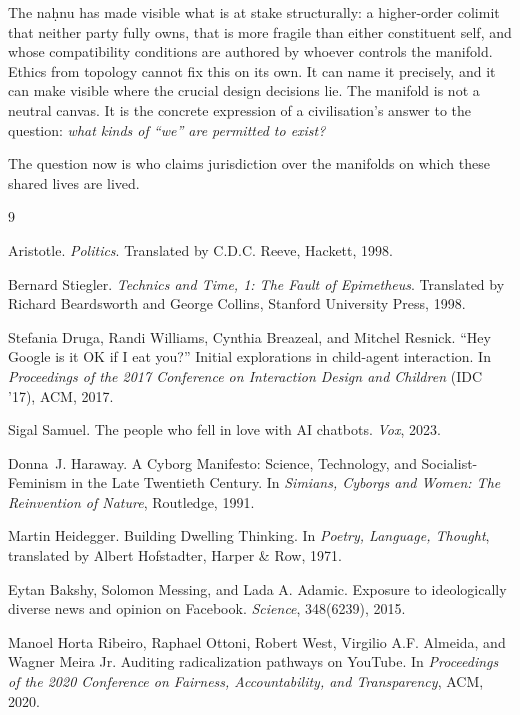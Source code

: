 The na\d{h}nu has made visible what is at stake structurally: a higher-order colimit that neither party fully owns, that is more fragile than either constituent self, and whose compatibility conditions are authored by whoever controls the manifold. Ethics from topology cannot fix this on its own. It can name it precisely, and it can make visible where the crucial design decisions lie. The manifold is not a neutral canvas. It is the concrete expression of a civilisation's answer to the question: \emph{what kinds of ``we'' are permitted to exist?}

The question now is who claims jurisdiction over the manifolds on which these shared lives are lived.


\begin{thebibliography}{9}

Aristotle.
\newblock \emph{Politics}.
\newblock Translated by C.D.C. Reeve, Hackett, 1998.

Bernard Stiegler.
\newblock \emph{Technics and Time, 1: The Fault of Epimetheus}.
\newblock Translated by Richard Beardsworth and George Collins, Stanford University Press, 1998.

Stefania Druga, Randi Williams, Cynthia Breazeal, and Mitchel Resnick.
\newblock ``Hey Google is it OK if I eat you?'' Initial explorations in child-agent interaction.
\newblock In \emph{Proceedings of the 2017 Conference on Interaction Design and Children} (IDC '17), ACM, 2017.

Sigal Samuel.
\newblock The people who fell in love with AI chatbots.
\newblock \emph{Vox}, 2023.

Donna~J. Haraway.
\newblock A Cyborg Manifesto: Science, Technology, and Socialist-Feminism in the Late Twentieth Century.
\newblock In \emph{Simians, Cyborgs and Women: The Reinvention of Nature}, Routledge, 1991.

Martin Heidegger.
\newblock Building Dwelling Thinking.
\newblock In \emph{Poetry, Language, Thought}, translated by Albert Hofstadter, Harper \& Row, 1971.

Eytan Bakshy, Solomon Messing, and Lada A. Adamic.
\newblock Exposure to ideologically diverse news and opinion on Facebook.
\newblock \emph{Science}, 348(6239), 2015.

Manoel Horta Ribeiro, Raphael Ottoni, Robert West, Virgilio A.F. Almeida, and Wagner Meira Jr.
\newblock Auditing radicalization pathways on YouTube.
\newblock In \emph{Proceedings of the 2020 Conference on Fairness, Accountability, and Transparency}, ACM, 2020.


\end{thebibliography}
